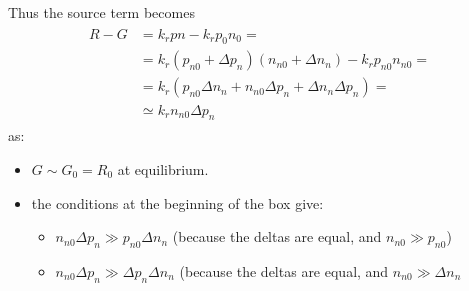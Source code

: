 \documentclass[letterpaper,10pt,english]{jupyterBook}
\begin{document}
\sphinxAtStartPar
Thus the source term becomes
\begin{equation*}
\begin{split}\begin{aligned}
R - G 
& = k_r p n - k_r p_0 n_0 = \\
& = k_r ( p_{n0} + \Delta p_n ) ( n_{n0} + \Delta n_n ) - k_r p_{n0} n_{n0} = \\
& = k_r ( p_{n0} \Delta n_n + n_{n0} \Delta p_n + \Delta n_n \Delta p_n ) = \\
& \simeq k_r n_{n0} \Delta p_n
\end{aligned}\end{split}
\end{equation*}
\sphinxAtStartPar
as:
\begin{itemize}
\item {} 
\sphinxAtStartPar
\(G \sim G_0 = R_0\) at equilibrium.  

\item {} 
\sphinxAtStartPar
the conditions at the beginning of the box give:
\begin{itemize}
\item {} 
\sphinxAtStartPar
\(n_{n0} \Delta p_n \gg p_{n0} \Delta n_n\) (because the deltas are equal, and \(n_{n0} \gg p_{n0}\))

\item {} 
\sphinxAtStartPar
\(n_{n0} \Delta p_n \gg \Delta p_n \Delta n_n\) (because the deltas are equal, and \(n_{n0} \gg \Delta n_{n}\)

\end{itemize}

\end{itemize}
\end{document}
